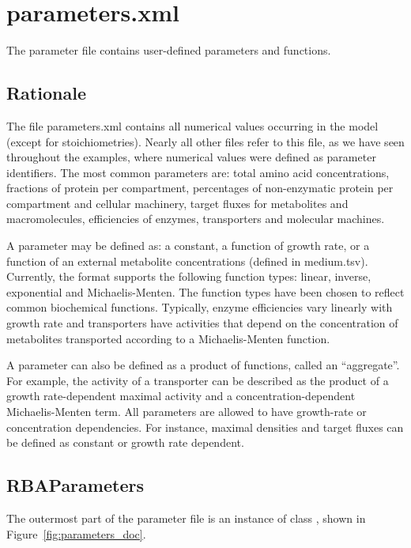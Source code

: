 
\section{parameters.xml}

The parameter file contains user-defined parameters and functions.

\subsection{Rationale}

The file parameters.xml contains all numerical values occurring in the model
(except for stoichiometries).
Nearly all other files refer to this file, as we have seen throughout the
examples, where numerical values were defined as parameter identifiers.
The most common parameters are: total amino acid concentrations,
fractions of protein per compartment,
percentages of non-enzymatic protein per compartment and cellular machinery,
target fluxes for metabolites and macromolecules, efficiencies of enzymes,
transporters and molecular machines.

A parameter may be defined as: a constant, a function of growth rate,
or a function of an external metabolite concentrations (defined in medium.tsv).
Currently, the format supports the following function types:
linear, inverse, exponential and Michaelis-Menten.
The function types have been chosen to reflect common biochemical functions.
Typically, enzyme efficiencies vary linearly with growth rate
and transporters have activities that depend on the concentration of metabolites transported
according to a Michaelis-Menten function.

A parameter can also be defined as a product of functions, called an ``aggregate''.
For example, the activity of a transporter can be described
as the product of a growth rate-dependent maximal activity and a
concentration-dependent Michaelis-Menten term.
All parameters are allowed to have growth-rate or concentration dependencies.
For instance, maximal densities and target fluxes can be defined as constant or growth rate dependent.

\subsection{RBAParameters}
\label{sec:rba_parameters}

The outermost part of the parameter file is an instance of class
\rbaparameters, shown in Figure~\ref{fig:parameters_doc}.

